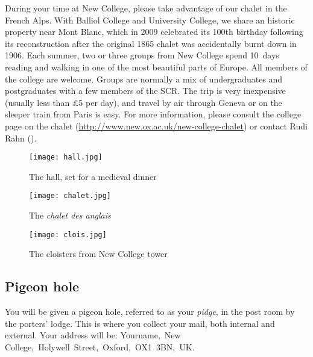 \documentclass[a4paper,fleqn,12pt]{book} %
\begin{document}
During your time at New College, please take advantage of our chalet in the
French Alps. With Balliol College and University College, we share an historic
property near Mont Blanc, which in 2009 celebrated its 100th birthday following
its reconstruction after the original 1865 chalet was accidentally burnt down in
1906. Each summer, two or three groups from New College spend 10~days reading
and walking in one of the most beautiful parts of Europe. All members of the college are welcome.
Groups are normally a mix of undergraduates and postgraduates with a few members
of the SCR. The trip is very inexpensive (usually less than \pounds5 per day), and
travel by air through Geneva or on the sleeper train from Paris is easy. For
more information, please consult the college page on the chalet
(\url{http://www.new.ox.ac.uk/new-college-chalet}) or contact Rudi Rahn
(\href{mailto:rudi.rahn@new.ox.ac.uk}{}).

\begin{figure}[htbp]
\centering
		\begin{minipage}{0.3\textwidth}
                \texttt{[image: hall.jpg]}
                \caption[Hall: Photo credit to Maureen Lenker]{The hall, set for
                a medieval dinner}
                \label{fig:hall}
        \end{minipage}%
        \quad
        \begin{minipage}{0.33\textwidth}
                \texttt{[image: chalet.jpg]}
                \caption[Chalet: Photo credit to Nick Altemose]{The
                \emph{cha\-let des ang\-lais}}
                \label{fig:chalet}
        \end{minipage}%
        \quad
        \begin{minipage}{0.3\textwidth}
                \texttt{[image: clois.jpg]}
                \caption[Cloisters: Photo credit to Alex Graham]{The cloisters
                from New College tower}
                \label{fig:clois}
        \end{minipage}%
\end{figure}

\subsection{Pigeon hole}

You will be given a pigeon hole, referred to as your \emph{pidge}, in the post
room by the porters' lodge. This is where you collect your mail, both internal and external. Your address will be: Yourname,~New College,~Holywell~Street,~Oxford,~OX1~3BN,~UK.
\end{document}
